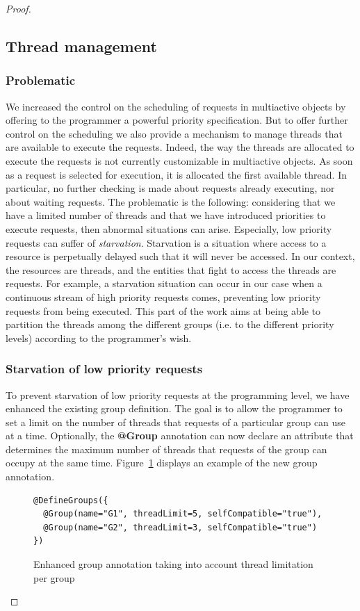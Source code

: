 \documentclass[11pt]{report}
\begin{document}
\begin{proof}
\subsection{Thread management}
\subsubsection{Problematic}
We increased the control on the scheduling of requests in multiactive objects by offering to the programmer a powerful priority specification. But to offer further control on the scheduling we also provide a mechanism to manage threads that are available to execute the requests. Indeed, the way the threads are allocated to execute the requests is not currently customizable in multiactive objects. As soon as a request is selected for execution, it is allocated the first available thread. In particular, no further checking is made about requests already executing, nor about waiting requests. The problematic is the following: considering that we have a limited number of threads and that we have introduced priorities to execute requests, then abnormal situations can arise. Especially, low priority requests can suffer of \emph{starvation}. Starvation is a situation where access to a resource is perpetually delayed such that it will never be accessed. In our context, the resources are threads, and the entities that fight to access the threads are requests. For example, a starvation situation can occur in our case when a continuous stream of high priority requests comes, preventing low priority requests from being executed. 
This part of the work aims at being able to partition the threads among the different groups (i.e. to the different priority levels) according to the programmer's wish. 

\subsubsection{Starvation of low priority requests}
To prevent starvation of low priority requests at the programming level, we have enhanced the existing group definition. The goal is to allow the programmer to set a limit on the number of threads that requests of a particular group can use at a time. Optionally, the \textbf{@Group} annotation can now declare an attribute that determines the maximum number of threads that requests of the group can occupy at the same time. Figure~\ref{fig:new_groups} displays an example of the new group annotation.

\begin{figure}[!ht]
	\lstset{language=java, numbers=left, numberstyle=\tiny, stepnumber=1, numbersep=5pt, basicstyle=\footnotesize}
	\begin{lstlisting}[frame=single]
@DefineGroups({
  @Group(name="G1", threadLimit=5, selfCompatible="true"),
  @Group(name="G2", threadLimit=3, selfCompatible="true")
})
 	\end{lstlisting}
\caption{Enhanced group annotation taking into account thread limitation per group}
\label{fig:new_groups}
\end{figure}


\end{proof}
\end{document}
